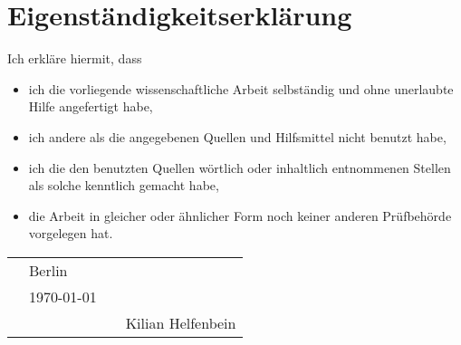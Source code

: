 
\section*{Eigenständigkeitserklärung}

\vspace{1cm}

Ich erkläre hiermit, dass

\begin{itemize}
	\item ich die vorliegende wissenschaftliche Arbeit selbständig und ohne unerlaubte Hilfe angefertigt habe,
	\item ich andere als die angegebenen Quellen und Hilfsmittel nicht benutzt habe,
	\item ich die den benutzten Quellen wörtlich oder inhaltlich entnommenen Stellen als solche kenntlich gemacht habe, 
	\item die Arbeit in gleicher oder ähnlicher Form noch keiner anderen Prüfbehörde vorgelegen hat.
\end{itemize}

\vspace{1cm}

\begin{tabular}{p{10mm}>{\centering\arraybackslash}p{50mm}p{10mm}>{\centering\arraybackslash}p{50mm}}
	&	{\large Berlin}	&	&									\\
	&	{\large \today}	& 	&	\hrulefill 						\\
	&					&	&	{\small Kilian Helfenbein}	
\end{tabular}

\newpage
